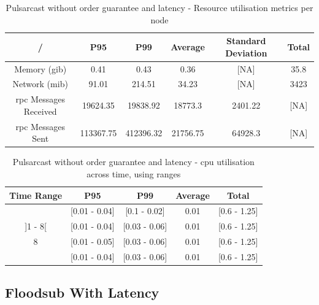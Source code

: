 \begin{table}[!htb]
\caption{Pulsarcast without order guarantee and latency - Resource utilisation metrics per node}
\label{table:pulsarcast-latency}
  \begin{center}
   \begin{tabular}{|c| c c c c c|} 
   \hline
   / & P95 & P99 & Average & Standard Deviation & Total \\ [0.5ex] 
   \hline\hline
   Memory (\acrshort{gib}) & 0.41 & 0.43 & 0.36 & [NA] & 35.8 \\
   \hline
   Network (\acrshort{mib}) & 91.01 & 214.51 & 34.23 & [NA] & 3423 \\
   \hline
   \acrshort{rpc} Messages Received & 19624.35 & 19838.92 & 18773.3 & 2401.22 & [NA] \\
   \hline
   \acrshort{rpc} Messages Sent & 113367.75 & 412396.32 & 21756.75 & 64928.3 & [NA] \\ [1ex] 
   \hline
  \end{tabular}
  \end{center}
\end{table}

\begin{table}[!htb]
\caption{Pulsarcast without order guarantee and latency - \acrshort{cpu} utilisation across time, using ranges}
\label{table:pulsarcast-latency-cpu}
  \begin{center}
   \begin{tabular}{|c| c c c c|} 
   \hline
   Time Range & P95 & P99 & Average & Total \\ [0.5ex] 
   \hline\hline
   [0 - 1] & [0.01 - 0.04] & [0.1 - 0.02] & 0.01 & [0.6 - 1.25] \\
   \hline
   ]1 - 8[ & [0.01 - 0.04] & [0.03 - 0.06]  & 0.01 & [0.6 - 1.25] \\
   \hline
   8 & [0.01 - 0.05] & [0.03 - 0.06] & 0.01 & [0.6 - 1.25] \\
   \hline
   [8 - 13] & [0.01 - 0.04] & [0.03 - 0.06]  & 0.01 & [0.6 - 1.25] \\
   \hline
  \end{tabular}
  \end{center}
\end{table}

\subsection{Floodsub With Latency}\label{subsec:floodsub-with-latency}

